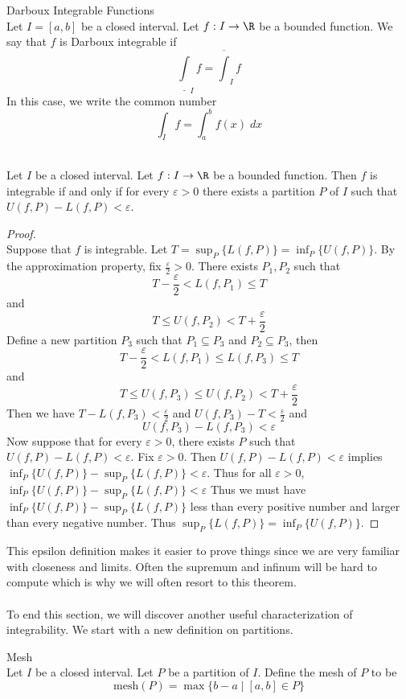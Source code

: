 \documentclass[a4paper]{article}
\begin{document}
\begin{defn}{Darboux Integrable Functions}{}\\
Let $I=[a,b]$ be a closed interval. Let $f:I\to\R$ be a bounded function. We say that $f$ is Darboux integrable if $$\underline{\int}_If=\overline{\int}_If$$ In this case, we write the common number $$\int_If=\int_a^bf(x)\;dx$$
\end{defn}

\begin{prp}{}{}\\
Let $I$ be a closed interval. Let $f:I\to\R$ be a bounded function. Then $f$ is integrable if and only if for every $\varepsilon>0$ there exists a partition $P$ of $I$ such that $U(f,P)-L(f,P)<\varepsilon$. 
\begin{proof}\\ Suppose that $f$ is integrable. Let $T=\sup_P\{L(f,P)\}=\inf_P\{U(f,P)\}$. By the approximation property, fix $\frac{\varepsilon}{2}>0$. There exists $P_1,P_2$ such that $$T-\frac{\varepsilon}{2}<L(f,P_1)\leq T$$ and $$T\leq U(f,P_2)<T+\frac{\varepsilon}{2}$$ Define a new partition $P_3$ such that $P_1\subseteq P_3$ and $P_2\subseteq P_3$, then $$T-\frac{\varepsilon}{2}<L(f,P_1)\leq L(f,P_3)\leq T$$ and $$T\leq U(f,P_3)\leq U(f,P_2)<T+\frac{\varepsilon}{2}$$ Then we have $T-L(f,P_3)<\frac{\varepsilon}{2}$ and $U(f,P_3)-T<\frac{\varepsilon}{2}$ and $$U(f,P_3)-L(f,P_3)<\varepsilon$$
Now suppose that for every $\varepsilon>0$, there exists $P$ such that $U(f,P)-L(f,P)<\varepsilon$. Fix $\varepsilon>0$. Then $U(f,P)-L(f,P)<\varepsilon$ implies $\inf_P\{U(f,P)\}-\sup_P\{L(f,P)\}<\varepsilon$. Thus for all $\varepsilon>0$, $\inf_P\{U(f,P)\}-\sup_P\{L(f,P)\}<\varepsilon$ Thus we must have $\inf_P\{U(f,P)\}-\sup_P\{L(f,P)\}$ less than every positive number and larger than every negative number. Thus $\sup_P\{L(f,P)\}=\inf_P\{U(f,P)\}$. 
\end{proof}
\end{prp}

This epsilon definition makes it easier to prove things since we are very familiar with closeness and limits. Often the supremum and infinum will be hard to compute which is why we will often resort to this theorem. \\~\\
To end this section, we will discover another useful characterization of integrability. We start with a new definition on partitions. 

\begin{defn}{Mesh}{}\\
Let $I$ be a closed interval. Let $P$ be a partition of $I$. Define the mesh of $P$ to be $$\text{mesh}(P)=\max\{b-a\;|\;[a,b]\in P\}$$
\end{defn}
\end{document}
